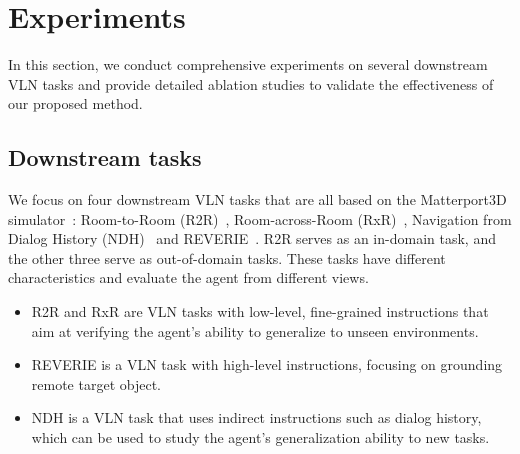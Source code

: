\documentclass[10pt,twocolumn,letterpaper]{article}
\begin{document}
\section{Experiments}
\label{sec:experiments}
In this section, we conduct comprehensive experiments on several downstream VLN tasks and provide detailed ablation studies to validate the effectiveness of our proposed method. 
\subsection{Downstream tasks}
We focus on four downstream VLN tasks that are all based on the Matterport3D simulator~\cite{r2r}: Room-to-Room (R2R)~\cite{r2r}, Room-across-Room (RxR)~\cite{rxr}, Navigation from Dialog History (NDH)~\cite{ndh} and REVERIE~\cite{reverie}. R2R serves as an in-domain task, and the other three serve as out-of-domain tasks. These tasks have different characteristics and evaluate the agent from different views.
\begin{itemize}[itemsep=2pt,topsep=2pt,parsep=2pt]
    \item R2R and RxR are VLN tasks with low-level, fine-grained instructions that aim at verifying the agent's ability to generalize to unseen environments.
    \item REVERIE is a VLN task with high-level instructions, focusing on grounding remote target object.
    \item NDH is a VLN task that uses indirect instructions such as dialog history, which can be used  to study the agent's generalization ability to new tasks.
\end{itemize}
\end{document}

